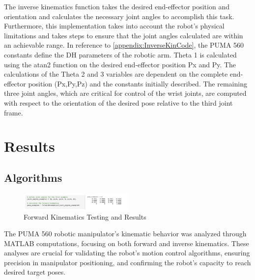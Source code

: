 \documentclass[conference]{IEEEtran}
\begin{document}
The inverse kinematics function takes the desired end-effector position and orientation and calculates the necessary joint angles to accomplish this task. Furthermore, this implementation takes into account the robot's physical limitations and takes steps to ensure that the joint angles calculated are within an achievable range. In reference to \ref{appendix:InverseKinCode}, the PUMA 560 constants define the DH parameters of the robotic arm. Theta 1 is calculated using the atan2 function on the desired end-effector position Px and Py. The calculations of the Theta 2 and 3 variables are dependent on the complete end-effector position (Px,Py,Pz) and the constants initially described. The remaining three joint angles, which are critical for control of the wrist joints, are computed with respect to the orientation of the desired pose relative to the third joint frame. 

\section{Results}
\subsection{Algorithms}
\begin{figure}[H]
    \centering
    \includegraphics[width=0.5\textwidth]{forwardKinTesting.png}
    \caption{Forward Kinematics Testing and Results}
    \label{fig:ForwardKinTesting}
\end{figure}

The PUMA 560 robotic manipulator's kinematic behavior was analyzed through MATLAB computations, focusing on both forward and inverse kinematics. These analyses are crucial for validating the robot's motion control algorithms, ensuring precision in manipulator positioning, and confirming the robot's capacity to reach desired target poses.
\end{document}
